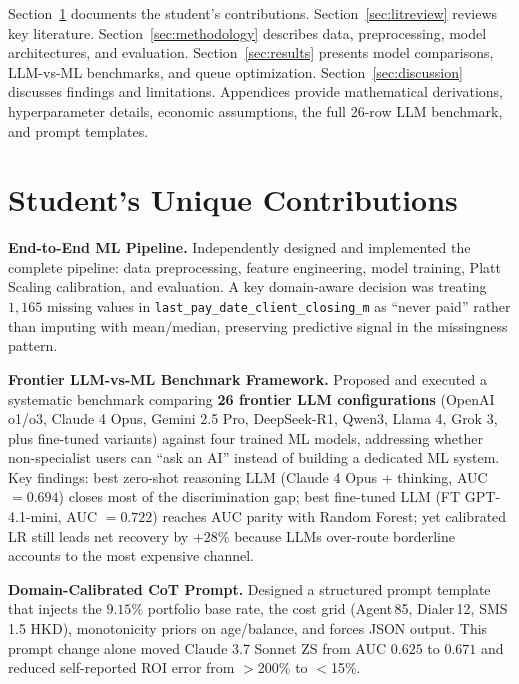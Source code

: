 \documentclass[11pt, a4paper]{article}
\begin{document}
Section~\ref{sec:contribution} documents the student's contributions. Section~\ref{sec:litreview} reviews key literature. Section~\ref{sec:methodology} describes data, preprocessing, model architectures, and evaluation. Section~\ref{sec:results} presents model comparisons, LLM-vs-ML benchmarks, and queue optimization. Section~\ref{sec:discussion} discusses findings and limitations. Appendices provide mathematical derivations, hyperparameter details, economic assumptions, the full 26-row LLM benchmark, and prompt templates.


\section{Student's Unique Contributions}\label{sec:contribution}

\textbf{End-to-End ML Pipeline.} Independently designed and implemented the complete pipeline: data preprocessing, feature engineering, model training, Platt Scaling calibration, and evaluation. A key domain-aware decision was treating $1{,}165$ missing values in \texttt{last\_pay\_date\_client\_closing\_m} as ``never paid'' rather than imputing with mean/median, preserving predictive signal in the missingness pattern.

\textbf{Frontier LLM-vs-ML Benchmark Framework.} Proposed and executed a systematic benchmark comparing \textbf{26 frontier LLM configurations} (OpenAI o1/o3, Claude 4 Opus, Gemini 2.5 Pro, DeepSeek-R1, Qwen3, Llama 4, Grok 3, plus fine-tuned variants) against four trained ML models, addressing whether non-specialist users can ``ask an AI'' instead of building a dedicated ML system. Key findings: best zero-shot reasoning LLM (Claude 4 Opus + thinking, AUC $= 0.694$) closes most of the discrimination gap; best fine-tuned LLM (FT GPT-4.1-mini, AUC $= 0.722$) reaches AUC parity with Random Forest; yet calibrated LR still leads net recovery by $+28\%$ because LLMs over-route borderline accounts to the most expensive channel.

\textbf{Domain-Calibrated CoT Prompt.} Designed a structured prompt template that injects the $9.15\%$ portfolio base rate, the cost grid (Agent\,85, Dialer\,12, SMS\,1.5 HKD), monotonicity priors on age/balance, and forces JSON output. This prompt change alone moved Claude 3.7 Sonnet ZS from AUC $0.625$ to $0.671$ and reduced self-reported ROI error from $>$200\% to $<$15\%.
\end{document}
